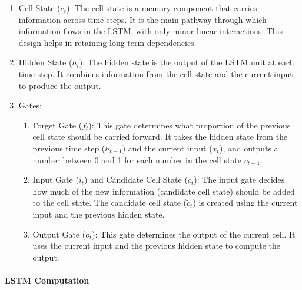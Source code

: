 \documentclass{article}
\begin{document}
    \begin{enumerate}[label={(\arabic*)}]
        \item Cell State ($c_t$): The cell state is a memory component that carries information across time steps. It is the main pathway through which information flows in the LSTM, with only minor linear interactions. This design helps in retaining long-term dependencies.

        \item Hidden State ($h_t$): The hidden state is the output of the LSTM unit at each time step. It combines information from the cell state and the current input to produce the output.

        \item {Gates}:
        \begin{enumerate}
            \item Forget Gate ($f_t$): This gate determines what proportion of the previous cell state should be carried forward. It takes the hidden state from the previous time step ($h_{t-1}$) and the current input ($x_t$), and outputs a number between 0 and 1 for each number in the cell state $c_{t-1}$.

            \item {Input Gate ($i_t$) and Candidate Cell State ($\tilde{c}_t$)}: The input gate decides how much of the new information (candidate cell state) should be added to the cell state. The candidate cell state ($\tilde{c}_t$) is created using the current input and the previous hidden state.

            \item {Output Gate ($o_t$)}: This gate determines the output of the current cell. It uses the current input and the previous hidden state to compute the output.
        \end{enumerate}
    \end{enumerate}

    \paragraph{LSTM Computation}
\end{document}
